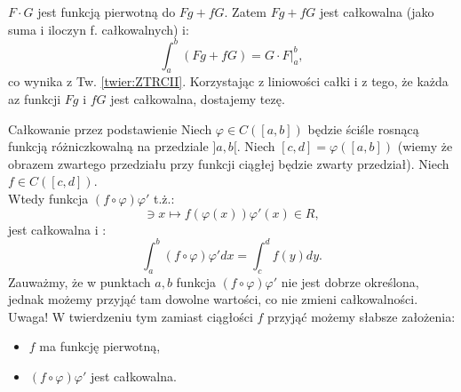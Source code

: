 \documentclass{article}
\numberwithin{defi}{section}
\numberwithin{defi}{section}
\begin{document}
\begin{dow}{}
    $F \cdot G$ jest funkcją pierwotną do $Fg + fG$. Zatem $Fg + fG$ jest całkowalna (jako suma i iloczyn f. całkowalnych) i: \begin{equation}
        \int_{a}^{b} (Fg + f G) = G \cdot F \big|_{a}^{b},
    \end{equation} co wynika z Tw. \ref*{twier:ZTRCII}. Korzystając z liniowości całki i z tego, że każda az funkcji $Fg$ i $fG$ jest całkowalna, dostajemy tezę.
\end{dow}


\begin{twier}{Całkowanie przez podstawienie}
    Niech $\varphi \in C([a, b])$ będzie ściśle rosnącą funkcją różniczkowalną na przedziale $]a, b[$. Niech $[c, d] = \varphi([a, b])$ (wiemy że obrazem zwartego przedziału przy funkcji ciągłej będzie zwarty przedział). Niech $f \in C([c, d])$. \\
    Wtedy funkcja $(f \circ \varphi) \varphi'$ t.ż.: \begin{equation}
        [a, b] \ni x \mapsto f(\varphi(x)) \varphi'(x) \in R, 
    \end{equation} jest całkowalna i :\begin{equation}
        \int_{a}^{b} (f \circ \varphi) \varphi' dx = \int_{c}^{d} f(y) dy.
    \end{equation} Zauważmy, że w punktach $a, b$ funkcja $(f \circ \varphi) \varphi'$ nie jest dobrze określona, jednak możemy przyjąć tam dowolne wartości, co nie zmieni całkowalności.\\
    Uwaga! W twierdzeniu tym zamiast ciągłości $f$ przyjąć możemy słabsze założenia: \begin{itemize}
        \item $f$ ma funkcję pierwotną,
        \item $(f \circ \varphi) \varphi '$ jest całkowalna.
    \end{itemize}
\end{twier}
\end{document}
